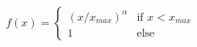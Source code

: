 \documentclass[preview]{standalone}
\begin{document}
\begin{align*}
f(x) = \begin{cases} (x/x_{max})^\alpha & \text{if } x < x_{max} \\ 1 & \text{else} \end{cases}
\end{align*}
\end{document}
